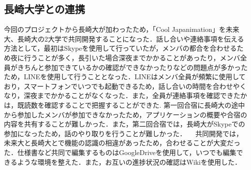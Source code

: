 \subsection{長崎大学との連携}
 今回のプロジェクトから長崎大が加わったため，「Cool Japanimation」を未来大、長崎大の2大学で共同開発することになった．話し合いや連絡事項を伝える方法として，最初はSkypeを使用して行っていたが，メンバの都合を合わせるため夜に行うことが多く，長引いた場合深夜までかかることがあったり，メンバ全員がきちんと参加できているかの確認ができなかったりなどの問題点が多かったため，LINEを使用して行うこととなった．LINEはメンバ全員が頻繁に使用しており，スマートフォンでいつでも起動できるため，話し合いの時間を合わせやくなり，深夜までかかることがなくなった．また，全員が連絡事項を確認できたかは，既読数を確認することで把握することができた.
 第一回合宿に長崎大の途中から参加したメンバが参加できなかったため，アプリケーションの概要や合宿の内容を共有することが難しかった．また，第二回合宿では，長崎大がSkypeでの参加になったため，話のやり取りを行うことが難しかった．
　共同開発では，未来大と長崎大とで機能の認識の相違があったため，合わせることが大変だった．仕様書など共同で編集するものはGoogleDriveを使用して，いつでも編集できるような環境を整えた．また，お互いの進捗状況の確認はWikiを使用した．
